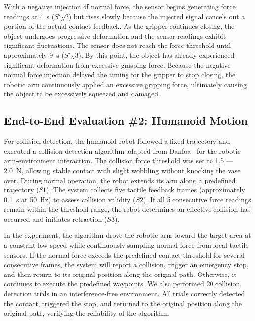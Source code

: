 With a negative injection of normal force, the sensor begins generating force readings at 4~s ($S'_N2$) but rises slowly because the injected signal cancels out a portion of the actual contact feedback. 
As the gripper continues closing, the object undergoes progressive deformation and the sensor readings exhibit significant fluctuations. The sensor does not reach the force threshold until approximately 9~s ($S'_N3$). By this point, the object has already experienced significant deformation from excessive grasping force. Because the negative normal force injection delayed the timing for the gripper to stop closing, the robotic arm continuously applied an excessive gripping force, ultimately causing the object to be excessively squeezed and damaged.

\subsection{End-to-End Evaluation \#2: Humanoid Motion}
\label{subsec:humanoid}
For collision detection, the humanoid robot followed a fixed trajectory and executed a collision detection algorithm adapted from Danfoa~\cite{danfoaForceSensorUtils} for the robotic arm-environment interaction. 
The collision force threshold was set to 1.5 --- 2.0~N, allowing stable contact with slight wobbling without knocking the vase over. During normal operation, the robot extends its arm along a predefined trajectory ($S1$). The system collects five tactile feedback frames (approximately 0.1~s at 50~Hz) to assess collision validity ($S2$). If all 5 consecutive force readings remain within the threshold range, the robot determines an effective collision has occurred and initiates retraction ($S3$). 

In the experiment, the algorithm drove the robotic arm toward the target area at a constant low speed while continuously sampling normal force from local tactile sensors. 
If the normal force exceeds the predefined contact threshold for several consecutive frames, the system will report a collision, trigger an emergency stop, and then return to its original position along the original path. Otherwise, it continues to execute the predefined waypoints. 
We also performed 20 collision detection trials in an interference-free environment. 
All trials correctly detected the contact, triggered the stop, and returned to the original position along the original path, verifying the reliability of the algorithm.

